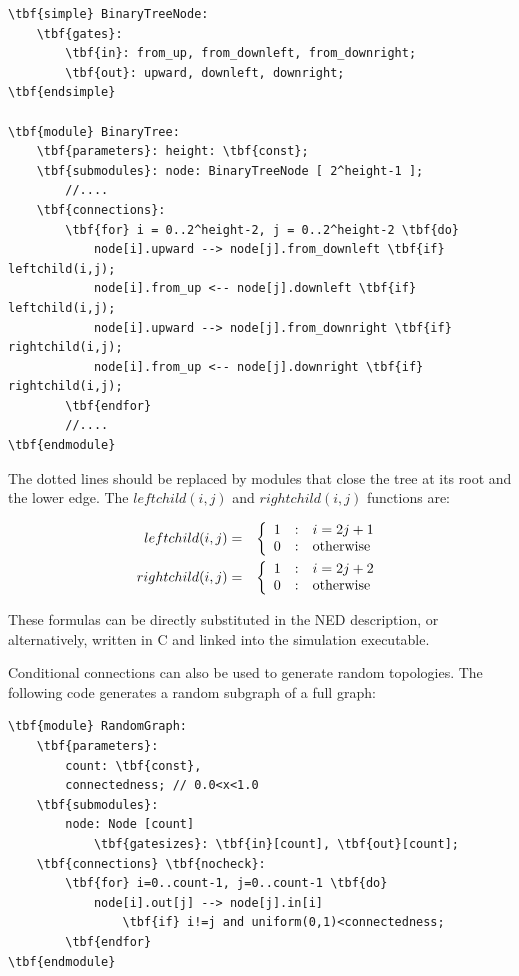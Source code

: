 \begin{Verbatim}[commandchars=\\\{\}]
\tbf{simple} BinaryTreeNode: 
    \tbf{gates}: 
        \tbf{in}: from_up, from_downleft, from_downright; 
        \tbf{out}: upward, downleft, downright;
\tbf{endsimple}

\tbf{module} BinaryTree:
    \tbf{parameters}: height: \tbf{const}; 
    \tbf{submodules}: node: BinaryTreeNode [ 2^height-1 ]; 
        //....
    \tbf{connections}:
        \tbf{for} i = 0..2^height-2, j = 0..2^height-2 \tbf{do} 
            node[i].upward --> node[j].from_downleft \tbf{if} leftchild(i,j); 
            node[i].from_up <-- node[j].downleft \tbf{if} leftchild(i,j); 
            node[i].upward --> node[j].from_downright \tbf{if} rightchild(i,j); 
            node[i].from_up <-- node[j].downright \tbf{if} rightchild(i,j); 
        \tbf{endfor} 
        //....
\tbf{endmodule}
\end{Verbatim}



The dotted lines should be replaced by modules that close the tree at
its root and the lower edge. The $leftchild(i,j)$ and
$rightchild(i,j)$ functions are:

\begin{eqnarray*}
leftchild(i,j)  & = & \left\{
    \begin{array}{r@{\quad:\quad}l}
      1 & i=2j+1\\
      0 & \mbox{otherwise}
    \end{array}
    \right.\\
rightchild(i,j) & = & \left\{
    \begin{array}{r@{\quad:\quad}l}
      1 & i=2j+2\\
      0 & \mbox{otherwise}
    \end{array}
    \right.
\end{eqnarray*}

These formulas can be directly substituted in the NED description, 
or alternatively, written in C and linked into the simulation 
executable.



Conditional connections can also be used to generate random
topologies.  The following code generates a
random subgraph of a full graph:


\begin{Verbatim}[commandchars=\\\{\}]
\tbf{module} RandomGraph:
    \tbf{parameters}:
        count: \tbf{const},
        connectedness; // 0.0<x<1.0
    \tbf{submodules}:
        node: Node [count]
            \tbf{gatesizes}: \tbf{in}[count], \tbf{out}[count];
    \tbf{connections} \tbf{nocheck}:
        \tbf{for} i=0..count-1, j=0..count-1 \tbf{do}
            node[i].out[j] --> node[j].in[i]
                \tbf{if} i!=j and uniform(0,1)<connectedness;
        \tbf{endfor}
\tbf{endmodule}
\end{Verbatim}



